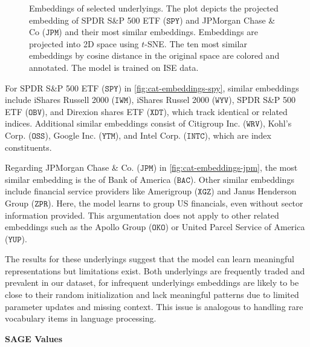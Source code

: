 \begin{figure}[h!]
    \vfill
    \caption[Embeddings of Selected Underlyings]{Embeddings of selected underlyings. The plot depicts the projected embedding of SPDR S\&P 500 ETF ($\mathtt{SPY}$) and JPMorgan Chase \& Co ($\mathtt{JPM}$) and their most similar embeddings. Embeddings are projected into 2D space using $t$-SNE. The ten most similar embeddings by cosine distance in the original space are colored and annotated. The model is trained on \gls{ISE} data.}
    \label{fig:categorical-embeddings}
\end{figure}

For SPDR S\&P 500 ETF ($\mathtt{SPY}$) in \cref{fig:cat-embeddings-spy}, similar embeddings include iShares Russell 2000 ($\mathtt{IWM}$), iShares Russel 2000 ($\mathtt{WYV}$), SPDR S\&P 500 ETF ($\mathtt{OBV}$), and Direxion shares ETF ($\mathtt{XDT}$), which track identical or related indices. Additional similar embeddings consist of Citigroup Inc. ($\mathtt{WRV}$), Kohl's Corp. ($\mathtt{OSS}$), Google Inc. ($\mathtt{YTM}$), and Intel Corp. ($\mathtt{INTC}$), which are index constituents.

Regarding JPMorgan Chase \& Co. ($\mathtt{JPM}$) in \cref{fig:cat-embeddings-jpm}, the most similar embedding is the of Bank of America ($\mathtt{BAC}$). Other similar embeddings include financial service providers like Amerigroup ($\mathtt{XGZ}$) and Janus Henderson Group ($\mathtt{ZPR}$). Here, the model learns to group US financials, even without sector information provided. This argumentation does not apply to other related embeddings such as the Apollo Group ($\mathtt{OKO}$) or United Parcel Service of America ($\mathtt{YUP}$). 

The results for these underlyings suggest that the model can learn meaningful representations but limitations exist. Both underlyings are frequently traded and prevalent in our dataset, for infrequent underlyings embeddings are likely to be close to their random initialization and lack meaningful patterns due to limited parameter updates and missing context. This issue is analogous to handling rare vocabulary items in language processing.

\textbf{SAGE Values}


